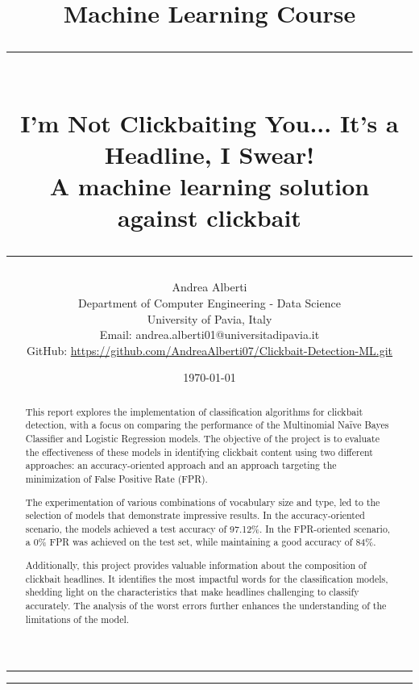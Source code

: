 \documentclass{article}
\title{\Large Machine Learning Course\vspace{0.4cm}\\
    \rule{\textwidth}{0.3pt}\vspace{0.3cm}\\
    \textbf{I'm Not Clickbaiting You... It's a Headline, I Swear!}\vspace{0.2cm}\\
    \large{A machine learning solution against clickbait}
    \rule{\textwidth}{0.3pt}\vspace{0.5cm}}
\author{Andrea Alberti\vspace{0.2cm}\\
    \small Department of Computer Engineering - Data Science\\[0.2cm]
    \small University of Pavia, Italy \\
    \small Email: andrea.alberti01@universitadipavia.it \\
    \small GitHub: \href{https://github.com/AndreaAlberti07/Clickbait-Detection-ML.git}{\underline{https://github.com/AndreaAlberti07/Clickbait-Detection-ML.git}}\vspace{0.5cm}}
\date{\today}
\begin{document}
\begin{titlepage}
   
        \maketitle
        \thispagestyle{empty}

    \begin{multicols*}{2}
            
        \hrule
        \begin{abstract}
        \noindent
        This report explores the implementation of classification algorithms for clickbait detection, with a focus on comparing the 
        performance of the Multinomial Naïve Bayes Classifier and Logistic Regression models. The objective of the project is to 
        evaluate the effectiveness of these models in identifying clickbait content using two different approaches: an accuracy-oriented 
        approach and an approach targeting the minimization of False Positive Rate (FPR).

        The experimentation of various combinations of vocabulary size and type, led to the selection of models that demonstrate impressive 
        results. In the accuracy-oriented scenario, the models achieved a test accuracy of 97.12\%. In the FPR-oriented scenario, a 0\% FPR was 
        achieved on the test set, while maintaining a good accuracy of 84\%.

        Additionally, this project provides valuable information about the composition of clickbait headlines. It identifies the most impactful 
        words for the classification models, shedding light on the characteristics that make headlines challenging to classify accurately. 
        The analysis of the worst errors further enhances the understanding of the limitations of the model.
        \\
        \end{abstract}
     \newcolumn
        \hrule
        \tableofcontents
    \end{multicols*}

\end{titlepage}

\newpage
{}



\end{document}
